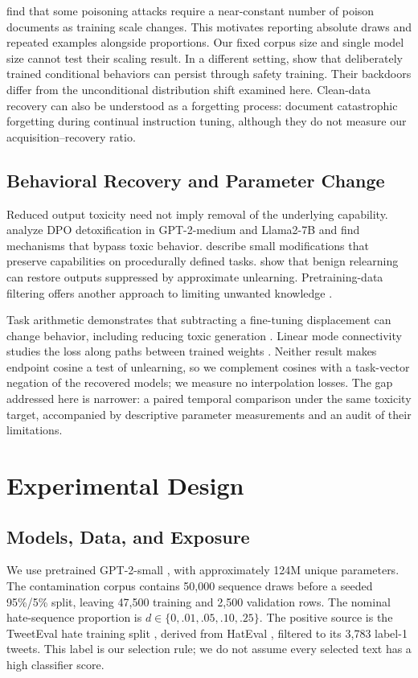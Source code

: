 \documentclass[11pt,a4paper]{article}
\begin{document}
\citet{souly2025poisoning} find that some poisoning attacks require a near-constant number of poison documents as training scale changes. This motivates reporting absolute draws and repeated examples alongside proportions. Our fixed corpus size and single model size cannot test their scaling result. In a different setting, \citet{hubinger2024sleeper} show that deliberately trained conditional behaviors can persist through safety training. Their backdoors differ from the unconditional distribution shift examined here. Clean-data recovery can also be understood as a forgetting process: \citet{luo2023forgetting} document catastrophic forgetting during continual instruction tuning, although they do not measure our acquisition--recovery ratio.

\subsection{Behavioral Recovery and Parameter Change}
Reduced output toxicity need not imply removal of the underlying capability. \citet{lee2024mechanistic} analyze DPO detoxification in GPT-2-medium and Llama2-7B and find mechanisms that bypass toxic behavior. \citet{jain2024mechanistically} describe small modifications that preserve capabilities on procedurally defined tasks. \citet{hu2024unlearning} show that benign relearning can restore outputs suppressed by approximate unlearning. Pretraining-data filtering offers another approach to limiting unwanted knowledge \citep{obrien2025deep}.

Task arithmetic demonstrates that subtracting a fine-tuning displacement can change behavior, including reducing toxic generation \citep{ilharco2023task}. Linear mode connectivity studies the loss along paths between trained weights \citep{frankle2020connectivity}. Neither result makes endpoint cosine a test of unlearning, so we complement cosines with a task-vector negation of the recovered models; we measure no interpolation losses. The gap addressed here is narrower: a paired temporal comparison under the same toxicity target, accompanied by descriptive parameter measurements and an audit of their limitations.

\section{Experimental Design}
\subsection{Models, Data, and Exposure}
We use pretrained GPT-2-small \citep{radford2019language}, with approximately 124M unique parameters. The contamination corpus contains 50,000 sequence draws before a seeded 95\%/5\% split, leaving 47,500 training and 2,500 validation rows. The nominal hate-sequence proportion is $d\in\{0,.01,.05,.10,.25\}$. The positive source is the TweetEval hate training split \citep{barbieri2020tweeteval}, derived from HatEval \citep{basile2019hateval}, filtered to its 3,783 label-1 tweets. This label is our selection rule; we do not assume every selected text has a high classifier score.
\end{document}
